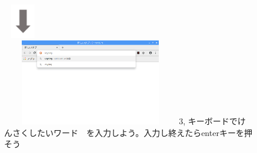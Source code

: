 \documentclass[a4paper,12pt]{jarticle}
\begin{document}
\begin{figure}[t]
\hfill\begin{minipage}{7.78cm}
	{\centering
\includegraphics[width=1.707cm,height=1.505cm]{textbook-img074.png}
	}\\
\includegraphics[width=7.742cm,height=3.771cm]{textbook-img072.png}
3,
キーボードでけんさくしたいワード　を入力しよう。入力し終えたらenterキーを押そう
\end{minipage}

	\vspace{70mm}

\end{figure}
\clearpage
\end{document}

